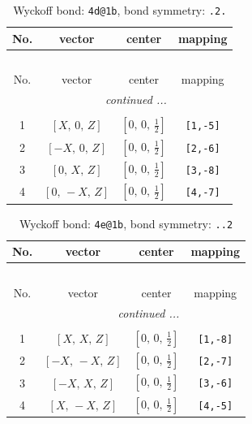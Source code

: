 \documentclass[fleqn,8pt]{jsarticle}
\begin{document}
\begin{longtable}{cccc}
\caption{Wyckoff bond: {\tt 4d@1b}, bond symmetry: {\tt .2.}}
 \\
 \hline \hline
No. & vector & center & mapping \\ \hline \endfirsthead

\multicolumn{3}{l}{\tablename\ \thetable{}} \\
 \hline \hline
No. & vector & center & mapping \\ \hline \endhead

 \hline \hline
\multicolumn{3}{r}{\footnotesize\it continued ...} \\ \endfoot

 \hline \hline
\multicolumn{3}{r}{} \\ \endlastfoot

1 & $\left[ X,\, 0,\, Z \right]$ & $\left[ 0,\, 0,\, \frac{1}{2} \right]$ & {\tt [1,-5]} \\ \hline
2 & $\left[ - X,\, 0,\, Z \right]$ & $\left[ 0,\, 0,\, \frac{1}{2} \right]$ & {\tt [2,-6]} \\ \hline
3 & $\left[ 0,\, X,\, Z \right]$ & $\left[ 0,\, 0,\, \frac{1}{2} \right]$ & {\tt [3,-8]} \\ \hline
4 & $\left[ 0,\, - X,\, Z \right]$ & $\left[ 0,\, 0,\, \frac{1}{2} \right]$ & {\tt [4,-7]} \\
\end{longtable}
\renewcommand{\arraystretch}{1.2}
\begin{longtable}{cccc}
\caption{Wyckoff bond: {\tt 4e@1b}, bond symmetry: {\tt ..2}}
 \\
 \hline \hline
No. & vector & center & mapping \\ \hline \endfirsthead

\multicolumn{3}{l}{\tablename\ \thetable{}} \\
 \hline \hline
No. & vector & center & mapping \\ \hline \endhead

 \hline \hline
\multicolumn{3}{r}{\footnotesize\it continued ...} \\ \endfoot

 \hline \hline
\multicolumn{3}{r}{} \\ \endlastfoot

1 & $\left[ X,\, X,\, Z \right]$ & $\left[ 0,\, 0,\, \frac{1}{2} \right]$ & {\tt [1,-8]} \\ \hline
2 & $\left[ - X,\, - X,\, Z \right]$ & $\left[ 0,\, 0,\, \frac{1}{2} \right]$ & {\tt [2,-7]} \\ \hline
3 & $\left[ - X,\, X,\, Z \right]$ & $\left[ 0,\, 0,\, \frac{1}{2} \right]$ & {\tt [3,-6]} \\ \hline
4 & $\left[ X,\, - X,\, Z \right]$ & $\left[ 0,\, 0,\, \frac{1}{2} \right]$ & {\tt [4,-5]} \\
\end{longtable}
\end{document}
